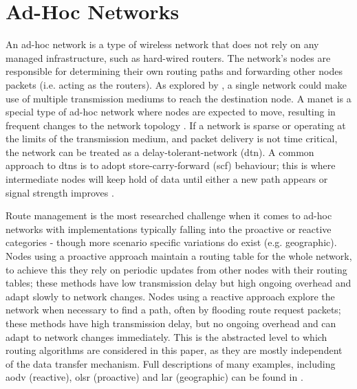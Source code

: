 \section{Ad-Hoc Networks}
An ad-hoc network is a type of wireless network that does not rely on any managed infrastructure, such as hard-wired routers. The network's nodes are responsible for determining their own routing paths and forwarding other nodes packets (i.e. acting as the routers). As explored by \cite{3YP:LORAWAN_MESH}, a single network could make use of multiple transmission mediums to reach the destination node. A \ac{manet} is a special type of ad-hoc network where nodes are expected to move, resulting in frequent changes to the network topology \cite{3YP:MANET_RFC2501}. If a network is sparse or operating at the limits of the transmission medium, and packet delivery is not time critical, the network can be treated as a delay-tolerant-network (\ac{dtn}). A common approach to \ac{dtn}s is to adopt store-carry-forward (\ac{scf}) behaviour; this is where intermediate nodes will keep hold of data until either a new path appears or signal strength improves \cite{3YP:DTNS}. 

Route management is the most researched challenge when it comes to ad-hoc networks \cite{3YP:MANET_RESEARCH_TRENDS} with implementations typically falling into the proactive or reactive categories - though more scenario specific variations do exist (e.g. geographic). Nodes using a proactive approach maintain a routing table for the whole network, to achieve this they rely on periodic updates from other nodes with their routing tables; these methods have low transmission delay but high ongoing overhead and adapt slowly to network changes. Nodes using a reactive approach explore the network when necessary to find a path, often by flooding route request packets; these methods have high transmission delay, but no ongoing overhead and can adapt to network changes immediately. This is the abstracted level to which routing algorithms are considered in this paper, as they are mostly independent of the data transfer mechanism. Full descriptions of many examples, including \ac{aodv} (reactive), \ac{olsr} (proactive) and \ac{lar} (geographic) can be found in \cite{3YP:ROUTING_ALGORITHMS}.